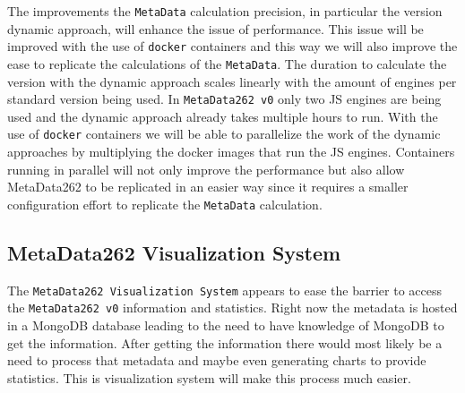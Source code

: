 \documentclass[runningheads]{llncs}
\begin{document}
The improvements the \texttt{MetaData} calculation precision, in particular the version dynamic approach, will enhance the issue of performance. This issue will be improved with the use of \texttt{docker}\cite{docker} containers and this way we will also improve the ease to replicate the calculations of the \texttt{MetaData}.
%
The duration to calculate the version with the dynamic approach scales linearly with the amount of engines per standard version being used. In \texttt{MetaData262 v0} only two JS engines are being used and the dynamic approach already takes multiple hours to run.
%
With the use of \texttt{docker} containers we will be able to parallelize the work of the dynamic approaches by multiplying the docker images that run the JS engines. Containers running in parallel will not only improve the performance but also allow MetaData262 to be replicated in an easier way since it requires a smaller configuration effort to replicate the \texttt{MetaData} calculation.


\subsection{MetaData262 Visualization System}
\label{sub:metadata262_visualization_system}


The \texttt{MetaData262 Visualization System} appears to ease the barrier to access the \texttt{MetaData262 v0} information and statistics. Right now the metadata is hosted in a MongoDB database leading to the need to have knowledge of MongoDB to get the information. After getting the information there would most likely be a need to process that metadata and maybe even generating charts to provide statistics. This is visualization system will make this process much easier.
\end{document}
